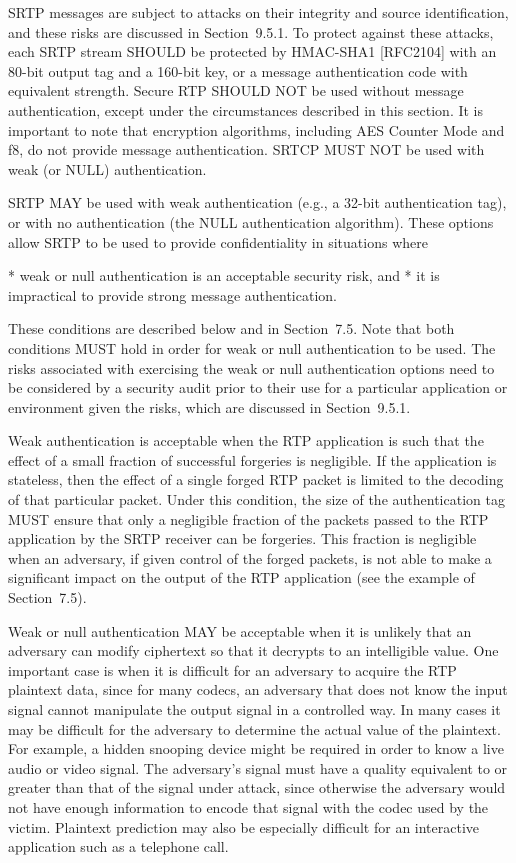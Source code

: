 \documentclass{article}
\begin{document}
SRTP messages are subject to attacks on their integrity and source identification, and these risks are discussed in Section~9.5.1.  To protect against these attacks, each SRTP stream SHOULD be protected by HMAC-SHA1 [RFC2104] with an 80-bit output tag and a 160-bit key, or a message authentication code with equivalent strength.  Secure RTP SHOULD NOT be used without message authentication, except under the circumstances described in this section.  It is important to note that encryption algorithms, including AES Counter Mode and f8, do not provide message authentication.  SRTCP MUST NOT be used with weak (or NULL) authentication.

SRTP MAY be used with weak authentication (e.g., a 32-bit authentication tag), or with no authentication (the NULL authentication algorithm).  These options allow SRTP to be used to provide confidentiality in situations where

* weak or null authentication is an acceptable security risk, and * it is impractical to provide strong message authentication.

These conditions are described below and in Section~7.5.  Note that both conditions MUST hold in order for weak or null authentication to be used.  The risks associated with exercising the weak or null authentication options need to be considered by a security audit prior to their use for a particular application or environment given the risks, which are discussed in Section~9.5.1.

Weak authentication is acceptable when the RTP application is such that the effect of a small fraction of successful forgeries is negligible.  If the application is stateless, then the effect of a single forged RTP packet is limited to the decoding of that particular packet.  Under this condition, the size of the authentication tag MUST ensure that only a negligible fraction of the packets passed to the RTP application by the SRTP receiver can be forgeries.  This fraction is negligible when an adversary, if given control of the forged packets, is not able to make a significant impact on the output of the RTP application (see the example of Section~7.5).

Weak or null authentication MAY be acceptable when it is unlikely that an adversary can modify ciphertext so that it decrypts to an intelligible value.  One important case is when it is difficult for an adversary to acquire the RTP plaintext data, since for many codecs, an adversary that does not know the input signal cannot manipulate the output signal in a controlled way.  In many cases it may be difficult for the adversary to determine the actual value of the plaintext.  For example, a hidden snooping device might be required in order to know a live audio or video signal.  The adversary's signal must have a quality equivalent to or greater than that of the signal under attack, since otherwise the adversary would not have enough information to encode that signal with the codec used by the victim.  Plaintext prediction may also be especially difficult for an interactive application such as a telephone call.
\end{document}
